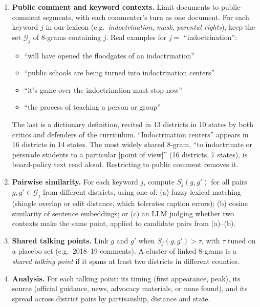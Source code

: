\begin{enumerate}
  \item \textbf{Public comment and keyword contexts.} Limit documents to public-comment segments,
  with each commenter's turn as one document. For each keyword $j$ in our lexicon (e.g.\
  \emph{indoctrination}, \emph{mask}, \emph{parental rights}), keep the set $\mathcal{G}_j$ of
  8-grams containing $j$. Real examples for $j = $ ``indoctrination'':
  \begin{itemize}
    \item ``will have opened the floodgates of an indoctrination''
    \item ``public schools are being turned into indoctrination centers''
    \item ``it's game over the indoctrination must stop now''
    \item ``the process of teaching a person or group''
  \end{itemize}
  The last is a dictionary definition, recited in 13 districts in 10 states by both critics and
  defenders of the curriculum. ``Indoctrination centers'' appears in 16 districts in 14 states.
  The most widely shared 8-gram, ``to indoctrinate or persuade students to a particular [point of
  view]'' (16 districts, 7 states), is board-policy text read aloud. Restricting to public comment
  removes it.

  \item \textbf{Pairwise similarity.} For each keyword $j$, compute $S_j(g, g')$ for all pairs
  $g, g' \in \mathcal{G}_j$ from different districts, using one of:
  (a) fuzzy lexical matching (shingle overlap or edit distance, which tolerates caption errors);
  (b) cosine similarity of sentence embeddings; or
  (c) an LLM judging whether two contexts make the same point, applied to candidate pairs from (a)--(b).

  \item \textbf{Shared talking points.} Link $g$ and $g'$ when $S_j(g, g') > \tau$, with $\tau$
  tuned on a placebo set (e.g.\ 2018--19 comments). A cluster of linked 8-grams is a
  \emph{shared talking point} if it spans at least two districts in different counties.

  \item \textbf{Analysis.} For each talking point: its timing (first appearance, peak), its source
  (official guidance, news, advocacy materials, or none found), and its spread across district
  pairs by partisanship, distance and state.
\end{enumerate}

